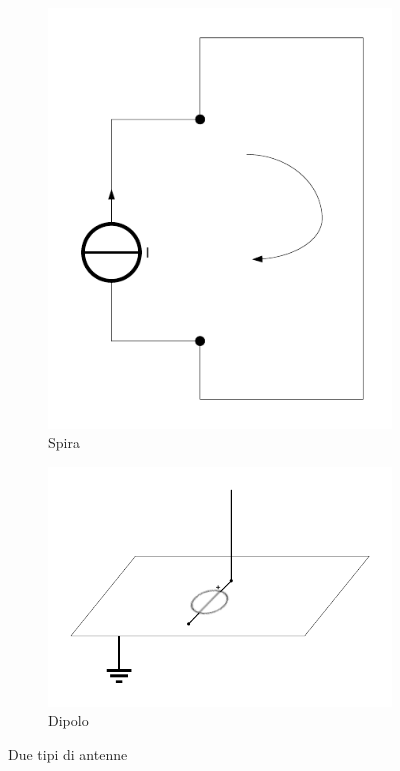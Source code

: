 \documentclass[11pt,4paper]{report}
\begin{document}
\begin{figure}[hbtp]
	\centering
	\begin{subfigure}{.3\textwidth}
		\centering
		\includegraphics[width=\linewidth]{emc/loop}
		\caption{Spira}
		\label{fig:loop}
	\end{subfigure}
	\begin{subfigure}{.5\textwidth}
		\centering
		\includegraphics[width=\linewidth]{emc/dipole}
		\caption{Dipolo}
		\label{fig:dipole}
	\end{subfigure}
	\caption{Due tipi di antenne}
\end{figure}
\end{document}

